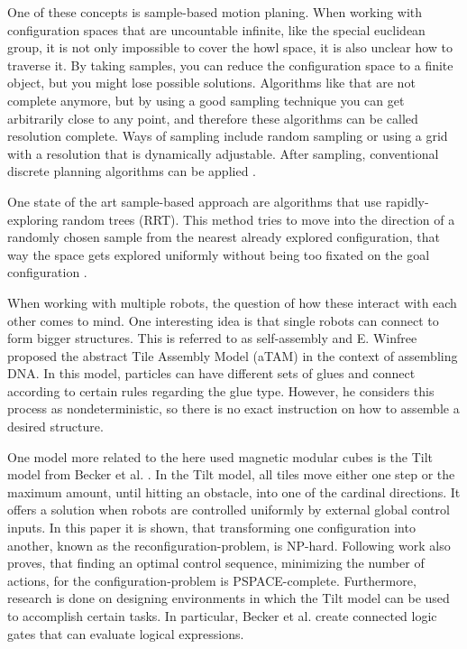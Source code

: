 One of these concepts is sample-based motion planing.
When working with configuration spaces that are uncountable infinite, like the special euclidean group, it is not only impossible to cover the howl space, it is also unclear how to traverse it.
By taking samples, you can reduce the configuration space to a finite object, but you might lose possible solutions.
Algorithms like that are not complete anymore, but by using a good sampling technique you can get arbitrarily close to any point, and therefore these algorithms can be called resolution complete.
Ways of sampling include random sampling or using a grid with a resolution that is dynamically adjustable.
After sampling, conventional discrete planning algorithms can be applied \cite{LaValle2006}.

One state of the art sample-based approach are algorithms that use rapidly-exploring random trees (RRT).
This method tries to move into the direction of a randomly chosen sample from the nearest already explored configuration, that way the space gets explored uniformly without being too fixated on the goal configuration \cite{lavalle1998,lavalle2001}.

When working with multiple robots, the question of how these interact with each other comes to mind.
One interesting idea is that single robots can connect to form bigger structures.
This is referred to as self-assembly and E. Winfree \cite{winfree1998} proposed the abstract Tile Assembly Model (aTAM) in the context of assembling DNA.
In this model, particles can have different sets of glues and connect according to certain rules regarding the glue type.
However, he considers this process as nondeterministic, so there is no exact instruction on how to assemble a desired structure.

One model more related to the here used magnetic modular cubes is the Tilt model from Becker et al. \cite{Becker2014_SP}.
In the Tilt model, all tiles move either one step or the maximum amount, until hitting an obstacle, into one of the cardinal directions.
It offers a solution when robots are controlled uniformly by external global control inputs.
In this paper it is shown, that transforming one configuration into another, known as the reconfiguration-problem, is NP-hard.
Following work \cite{Becker2014} also proves, that finding an optimal control sequence, minimizing the number of actions, for the configuration-problem is PSPACE-complete.
Furthermore, research is done on designing environments in which the Tilt model can be used to accomplish certain tasks.
In particular, Becker et al. \cite{Becker2014} create connected logic gates that can evaluate logical expressions.

